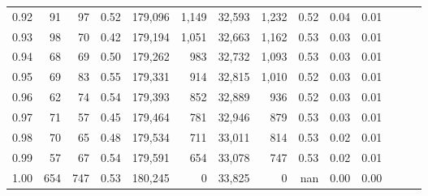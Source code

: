 \begin{tabular}{rrrrrrrrrrrrrr}
0.92 &     91 &   97 &  0.52 &  179,096 &    1,149 &  32,593 &   1,232 &  0.52 &  0.04 &      0.01 \\
0.93 &     98 &   70 &  0.42 &  179,194 &    1,051 &  32,663 &   1,162 &  0.53 &  0.03 &      0.01 \\
0.94 &     68 &   69 &  0.50 &  179,262 &      983 &  32,732 &   1,093 &  0.53 &  0.03 &      0.01 \\
0.95 &     69 &   83 &  0.55 &  179,331 &      914 &  32,815 &   1,010 &  0.52 &  0.03 &      0.01 \\
0.96 &     62 &   74 &  0.54 &  179,393 &      852 &  32,889 &     936 &  0.52 &  0.03 &      0.01 \\
0.97 &     71 &   57 &  0.45 &  179,464 &      781 &  32,946 &     879 &  0.53 &  0.03 &      0.01 \\
0.98 &     70 &   65 &  0.48 &  179,534 &      711 &  33,011 &     814 &  0.53 &  0.02 &      0.01 \\
0.99 &     57 &   67 &  0.54 &  179,591 &      654 &  33,078 &     747 &  0.53 &  0.02 &      0.01 \\
1.00 &    654 &  747 &  0.53 &  180,245 &        0 &  33,825 &       0 &   nan &  0.00 &      0.00 \\
\bottomrule
\end{tabular}
